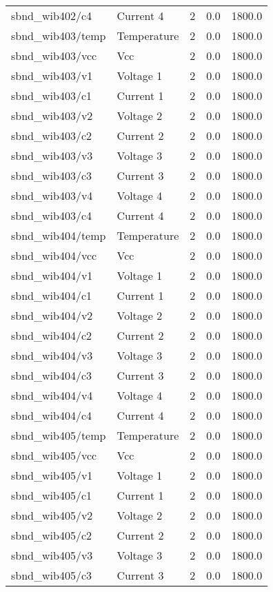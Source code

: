 \begin{center}
\begin{longtable}{l | l l l l }
sbnd\_wib402/c4 & Current 4 & 2 & 0.0 & 1800.0\\ 
sbnd\_wib403/temp & Temperature & 2 & 0.0 & 1800.0\\ 
sbnd\_wib403/vcc & Vcc & 2 & 0.0 & 1800.0\\ 
sbnd\_wib403/v1 & Voltage 1 & 2 & 0.0 & 1800.0\\ 
sbnd\_wib403/c1 & Current 1 & 2 & 0.0 & 1800.0\\ 
sbnd\_wib403/v2 & Voltage 2 & 2 & 0.0 & 1800.0\\ 
sbnd\_wib403/c2 & Current 2 & 2 & 0.0 & 1800.0\\ 
sbnd\_wib403/v3 & Voltage 3 & 2 & 0.0 & 1800.0\\ 
sbnd\_wib403/c3 & Current 3 & 2 & 0.0 & 1800.0\\ 
sbnd\_wib403/v4 & Voltage 4 & 2 & 0.0 & 1800.0\\ 
sbnd\_wib403/c4 & Current 4 & 2 & 0.0 & 1800.0\\ 
sbnd\_wib404/temp & Temperature & 2 & 0.0 & 1800.0\\ 
sbnd\_wib404/vcc & Vcc & 2 & 0.0 & 1800.0\\ 
sbnd\_wib404/v1 & Voltage 1 & 2 & 0.0 & 1800.0\\ 
sbnd\_wib404/c1 & Current 1 & 2 & 0.0 & 1800.0\\ 
sbnd\_wib404/v2 & Voltage 2 & 2 & 0.0 & 1800.0\\ 
sbnd\_wib404/c2 & Current 2 & 2 & 0.0 & 1800.0\\ 
sbnd\_wib404/v3 & Voltage 3 & 2 & 0.0 & 1800.0\\ 
sbnd\_wib404/c3 & Current 3 & 2 & 0.0 & 1800.0\\ 
sbnd\_wib404/v4 & Voltage 4 & 2 & 0.0 & 1800.0\\ 
sbnd\_wib404/c4 & Current 4 & 2 & 0.0 & 1800.0\\ 
sbnd\_wib405/temp & Temperature & 2 & 0.0 & 1800.0\\ 
sbnd\_wib405/vcc & Vcc & 2 & 0.0 & 1800.0\\ 
sbnd\_wib405/v1 & Voltage 1 & 2 & 0.0 & 1800.0\\ 
sbnd\_wib405/c1 & Current 1 & 2 & 0.0 & 1800.0\\ 
sbnd\_wib405/v2 & Voltage 2 & 2 & 0.0 & 1800.0\\ 
sbnd\_wib405/c2 & Current 2 & 2 & 0.0 & 1800.0\\ 
sbnd\_wib405/v3 & Voltage 3 & 2 & 0.0 & 1800.0\\ 
sbnd\_wib405/c3 & Current 3 & 2 & 0.0 & 1800.0\\ 

\end{longtable}
\end{center}
